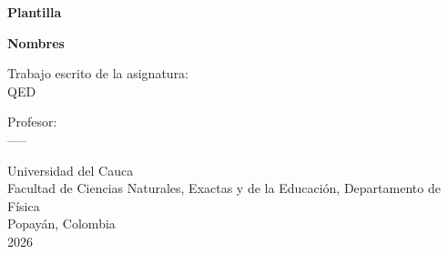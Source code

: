 \begin{titlepage}

    \begin{center}

        {\fontsize{18}{18}\selectfont \textbf{{Plantilla}}}
            
        \vfill

        {\textbf{Nombres}}
               
        \vfill
        
        {Trabajo  escrito de la asignatura:}\\
        {QED}
        
        \vfill
        
        {Profesor:}\\
        {-----}

        
        \vfill

        {Universidad del Cauca}\\
        {Facultad de Ciencias Naturales, Exactas y de la Educación, Departamento de Física}\\
        {Popayán, Colombia}\\
        {2026}
        
        \end{center}

\end{titlepage}